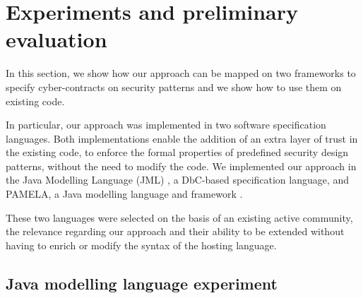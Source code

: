 
\section{Experiments and preliminary evaluation}

In this section, we show how our approach can be mapped on two frameworks to specify cyber-contracts on security patterns and we show how to use them on existing code.

In particular, our approach was implemented in two software specification languages. Both implementations enable the addition of an extra layer of trust in the existing code, to enforce the formal properties of predefined security design patterns, without the need to modify the code. We implemented our approach in the Java Modelling Language (JML) \cite{leavens2006}, a DbC-based specification language, and PAMELA, a Java modelling language and framework \cite{PAMELAWebSite}.

These two languages were selected on the basis of an existing active community, the relevance regarding our approach and their ability to be extended without having to enrich or modify the syntax of the hosting language.

\subsection{Java modelling language experiment}

